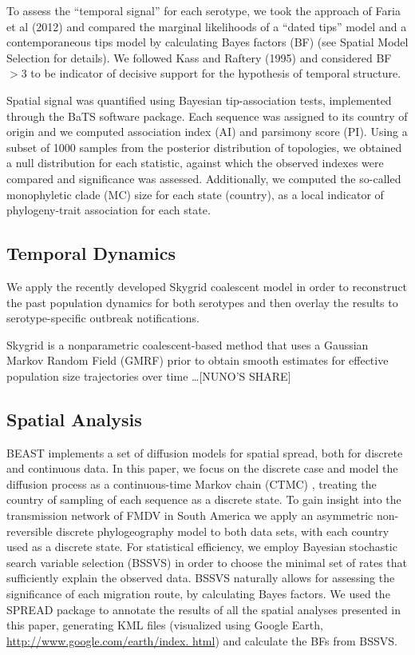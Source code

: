 \documentclass[10pt]{article}
\begin{document}
To assess the ``temporal signal'' for each serotype, we took the approach of Faria et al (2012) \cite{Faria2012} and compared the marginal likelihoods of a ``dated tips'' model and a contemporaneous tips model by calculating Bayes factors (BF) \cite{Suchard2001,KassRaftery1995} (see Spatial Model Selection for details). We followed Kass and Raftery (1995) \cite{KassRaftery1995} and considered BF$>3$ to be indicator of decisive support for the hypothesis of temporal structure.

Spatial signal was quantified using Bayesian tip-association tests, implemented through the BaTS software package\cite{bats}. Each sequence was assigned to its country of origin and we computed association index (AI) and parsimony score (PI). Using a subset of 1000 samples from the posterior distribution of topologies, we obtained a null distribution for each statistic, against which the observed indexes were compared and significance was assessed. Additionally, we computed the so-called monophyletic clade (MC) size for each state (country), as a local indicator of phylogeny-trait association for each state.


\subsection*{Temporal Dynamics}

We apply the recently developed Skygrid coalescent model \cite{skygrid} in order to reconstruct the past population dynamics for both serotypes and then overlay the results to serotype-specific outbreak notifications.

Skygrid is a nonparametric coalescent-based method that uses a Gaussian Markov Random Field (GMRF) prior to obtain smooth estimates for effective population size trajectories over time \ldots [NUNO'S SHARE]


\subsection*{Spatial Analysis}

BEAST \cite{BEAST} implements a set of diffusion models for spatial spread, both for discrete and continuous data. In this paper, we focus on the discrete case and model the diffusion process as a continuous-time Markov chain (CTMC) \cite{roots}, treating the country of sampling of each sequence as a discrete state. To gain insight into the transmission network of FMDV in South America we apply an asymmetric non-reversible discrete phylogeography model to both data sets, with each country used as a discrete state. For statistical efficiency, we employ Bayesian stochastic search variable selection (BSSVS) in order to choose the minimal set of rates that sufficiently explain the observed data. BSSVS naturally allows for assessing the significance of each migration route, by calculating Bayes factors. We used the SPREAD \cite{spread} package to annotate the results of all the spatial analyses presented in this paper, generating KML files (visualized using Google Earth, \url{http://www.google.com/earth/index.
html}) and calculate the BFs from BSSVS.
\end{document}
